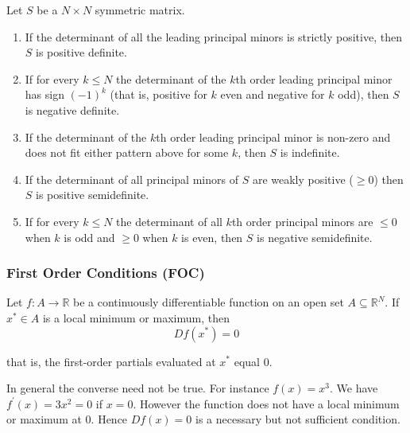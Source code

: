 \documentclass{article}
\begin{document}
\begin{theorem}
  Let $S$ be a $N \times N$ symmetric matrix.
  \begin{enumerate}
    \item If the determinant of all the leading principal minors is strictly positive, then $S$ is positive definite.

    \item If for every $k \le N$ the determinant of the $k$th order leading principal minor has sign $(-1)^k$ (that is, positive for $k$ even and negative for $k$ odd), then $S$ is negative definite.

    \item If the determinant of the $k$th order leading principal minor is non-zero and does not fit either pattern above for some $k$, then $S$ is indefinite.

    \item If the determinant of all principal minors of $S$ are weakly positive ($\ge 0$) then $S$ is positive semidefinite.

    \item If for every $k \le N$ the determinant of all $k$th order principal minors are $\le 0$ when $k$ is odd and $\ge 0$ when $k$ is even, then $S$ is negative semidefinite.
  \end{enumerate}
\end{theorem}

\subsubsection{First Order Conditions (FOC)}
\label{ssub:first_order_conditions_foc_}

\begin{theorem}
  Let $f: A \to \mathbb{R}$ be a continuously differentiable function on an open set $A \subseteq \mathbb{R}^N$. If $x^* \in A$ is a local minimum or maximum, then
  \[
    D f(x^*) = 0
  \]

  that is, the first-order partials evaluated at $x^*$ equal $0$.
\end{theorem}

\begin{remark}
  In general the converse need not be true. For instance $f(x) = x^3$. We have $f^\prime(x) = 3x^2 = 0$ if $x = 0$. However the function does not have a local minimum or maximum at $0$. Hence $D f(x) = 0$ is a necessary but not sufficient condition.
\end{remark}
\end{document}
